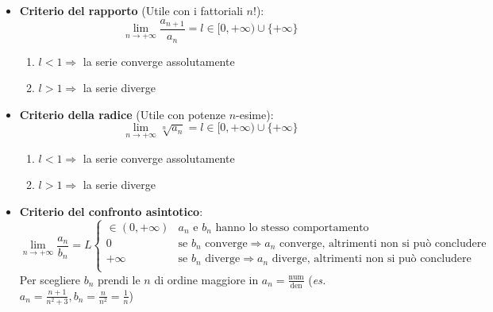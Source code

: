 \documentclass[12pt, a4paper]{article}
\begin{document}
        \begin{itemize}
            \item \textbf{Criterio del rapporto} (Utile con i fattoriali $n!$): \begin{equation*}
                \lim_{n\rightarrow +\infty}\frac{a_{n+1}}{a_n} = l \in [0,+\infty)\cup\{+\infty\}
            \end{equation*} \begin{enumerate}
                \item $l<1\Rightarrow$ la serie converge assolutamente
                \item $l>1\Rightarrow$ la serie diverge
            \end{enumerate}
            \item \textbf{Criterio della radice} (Utile con potenze $n$-esime): \begin{equation*}
                \lim_{n\rightarrow+\infty}\sqrt[n]{a_n} = l \in [0,+\infty)\cup\{+\infty\}
            \end{equation*} \begin{enumerate}
                \item $l<1\Rightarrow$ la serie converge assolutamente
                \item $l>1\Rightarrow$ la serie diverge
            \end{enumerate}
            \item \textbf{Criterio del confronto asintotico}:
            \begin{equation*}
                \lim_{n\rightarrow +\infty}\frac{a_n}{b_n} = L \begin{cases}
                    \in (0,+\infty) & a_n \text{ e } b_n \text{ hanno lo stesso comportamento}\\
                    0 & \text{se } b_n \text{ converge} \Rightarrow a_n \text{ converge, altrimenti non si può concludere}\\
                    +\infty & \text{se } b_n \text{ diverge} \Rightarrow a_n \text{ diverge, altrimenti non si può concludere}\\
                \end{cases}
            \end{equation*}
            Per scegliere $b_n$ prendi le $n$ di ordine maggiore in $a_n=\frac{\text{num}}{\text{den}}$ (\textit{es.} $a_n=\frac{n+1}{n^2+3}, b_n=\frac{n}{n^2}=\frac{1}{n}$)
        \end{itemize}
\end{document}
